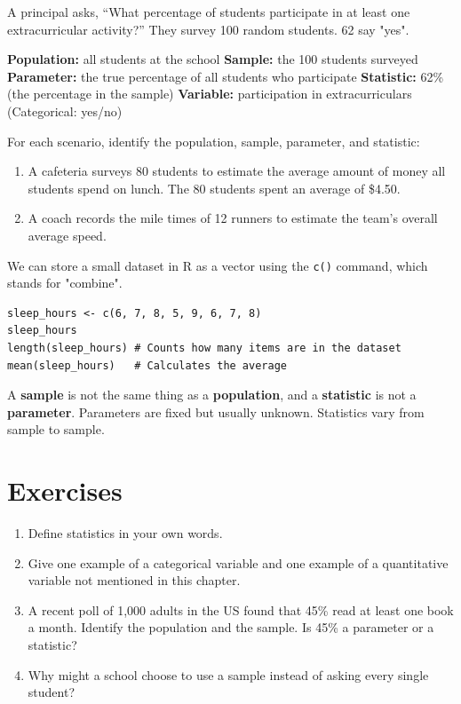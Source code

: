 \documentclass[11pt,openany]{book}
\begin{document}
\begin{examplebox}
A principal asks, ``What percentage of students participate in at least one extracurricular activity?'' They survey 100 random students. 62 say "yes".

\textbf{Population:} all students at the school
\textbf{Sample:} the 100 students surveyed
\textbf{Parameter:} the true percentage of all students who participate
\textbf{Statistic:} 62\% (the percentage in the sample)
\textbf{Variable:} participation in extracurriculars (Categorical: yes/no)
\end{examplebox}

\begin{byhand}
For each scenario, identify the population, sample, parameter, and statistic:
\begin{enumerate}
    \item A cafeteria surveys 80 students to estimate the average amount of money all students spend on lunch. The 80 students spent an average of \$4.50.
    \item A coach records the mile times of 12 runners to estimate the team's overall average speed.
\end{enumerate}
\end{byhand}

\begin{rstudio}
We can store a small dataset in R as a vector using the \texttt{c()} command, which stands for "combine".
\begin{lstlisting}[style=rcode]
sleep_hours <- c(6, 7, 8, 5, 9, 6, 7, 8)
sleep_hours
length(sleep_hours) # Counts how many items are in the dataset
mean(sleep_hours)   # Calculates the average
\end{lstlisting}
\end{rstudio}

\begin{mistakealert}
A \textbf{sample} is not the same thing as a \textbf{population}, and a \textbf{statistic} is not a \textbf{parameter}. Parameters are fixed but usually unknown. Statistics vary from sample to sample.
\end{mistakealert}

\section{Exercises}
\begin{enumerate}
    \item Define statistics in your own words.
    \item Give one example of a categorical variable and one example of a quantitative variable not mentioned in this chapter.
    \item A recent poll of 1,000 adults in the US found that 45\% read at least one book a month. Identify the population and the sample. Is 45\% a parameter or a statistic?
    \item Why might a school choose to use a sample instead of asking every single student?
\end{enumerate}
\end{document}
